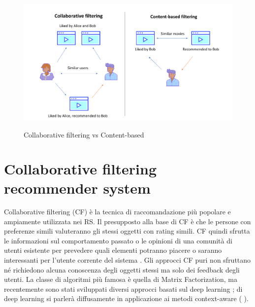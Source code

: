 \begin{figure}
  \centering
  \includegraphics[width=\linewidth]{immagini/cb_cf_schema.png}
  \caption{Collaborative filtering vs Content-based}
  \cite{cf-cb-picture}
  \label{fig:cb-cf}
  
\end{figure}

\section{Collaborative filtering recommender system}
Collaborative filtering (CF) è la tecnica di raccomandazione più popolare e ampiamente utilizzata nei RS. %
Il presupposto alla base di CF è che le persone con preferenze simili valuteranno gli stessi oggetti con rating simili. CF quindi sfrutta le informazioni sul comportamento passato o le opinioni di una comunità di utenti esistente per prevedere quali elementi potranno piacere o saranno interessanti per l'utente corrente del sistema \cite{recsys-intro}. Gli approcci CF puri non sfruttano né richiedono alcuna conoscenza degli oggetti stessi ma solo dei feedback degli utenti. La classe di algoritmi più famosa è quella di Matrix Factorization, ma recentemente sono stati sviluppati diversi approcci basati sul deep learning \cite{deep-learning-survey}; di deep learning si parlerà diffusamente in applicazione ai metodi context-aware (
).

